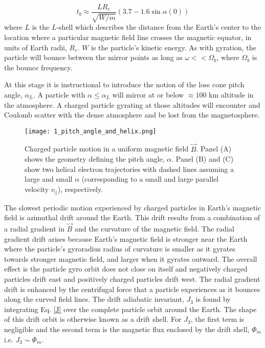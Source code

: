 \begin{equation}
t_b \approx \frac{L R_e}{\sqrt{W/m}} (3.7 - 1.6 \sin{\alpha(0)})
\end{equation} where $L$ is the $L$-shell which describes the distance from the Earth's center to the location where a particular magnetic field line crosses the magnetic equator, in units of Earth radii, $R_e$. $W$ is the particle's kinetic energy. As with gyration, the particle will bounce between the mirror points as long as $\omega << \Omega_b$, where $\Omega_b$ is the bounce frequency.

At this stage it is instructional to introduce the notion of the loss cone pitch angle, $\alpha_L$.  A particle with $\alpha \leq \alpha_L$ will mirror at or below $\approx 100$ km altitude in the atmosphere. A charged particle gyrating at those altitudes will encounter and Coulomb scatter with the dense atmosphere and be lost from the magnetosphere.

\begin{figure}
\texttt{[image: 1\_pitch\_angle\_and\_helix.png]}
\caption{Charged particle motion in a uniform magnetic field $\vec{B}$. Panel (A) shows the geometry defining the pitch angle, $\alpha$. Panel (B) and (C) show two helical electron trajectories with dashed lines assuming a large and small $\alpha$ (corresponding to a small and large parallel velocity $v_{||}$), respectively.}
\label{Intro:pa}
\end{figure}

The slowest periodic motion experienced by charged particles in Earth's magnetic field is azimuthal drift around the Earth. This drift results from a combination of a radial gradient in $\vec{B}$ and the curvature of the magnetic field. The radial gradient drift arises because Earth's magnetic field is stronger near the Earth where the particle's gyroradius radius of curvature is smaller as it gyrates towards stronger magnetic field, and larger when it gyrates outward. The overall effect is the particle gyro orbit does not close on itself and negatively charged particles drift east and positively charged particles drift west. The radial gradient drift is enhanced by the centrifugal force that a particle experiences as it bounces along the curved field lines. The drift adiabatic invariant, $J_3$ is found by integrating Eq. \ref{J} over the complete particle orbit around the Earth. The shape of this drift orbit is otherwise known as a drift shell. For $J_3$, the first term is negligible and the second term is the magnetic flux enclosed by the drift shell, $\Phi_m$  i.e. $J_3 \sim \Phi_m$. 

